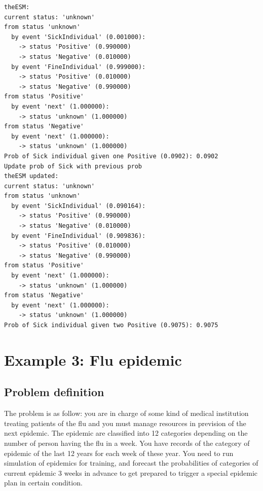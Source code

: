 \documentclass[12pt, a4paper]{article}
\begin{document}
\begin{scriptsize}
\begin{ttfamily}
\begin{lstlisting}
theESM:
current status: 'unknown'
from status 'unknown'
  by event 'SickIndividual' (0.001000):
    -> status 'Positive' (0.990000)
    -> status 'Negative' (0.010000)
  by event 'FineIndividual' (0.999000):
    -> status 'Positive' (0.010000)
    -> status 'Negative' (0.990000)
from status 'Positive'
  by event 'next' (1.000000):
    -> status 'unknown' (1.000000)
from status 'Negative'
  by event 'next' (1.000000):
    -> status 'unknown' (1.000000)
Prob of Sick individual given one Positive (0.0902): 0.0902
Update prob of Sick with previous prob
theESM updated:
current status: 'unknown'
from status 'unknown'
  by event 'SickIndividual' (0.090164):
    -> status 'Positive' (0.990000)
    -> status 'Negative' (0.010000)
  by event 'FineIndividual' (0.909836):
    -> status 'Positive' (0.010000)
    -> status 'Negative' (0.990000)
from status 'Positive'
  by event 'next' (1.000000):
    -> status 'unknown' (1.000000)
from status 'Negative'
  by event 'next' (1.000000):
    -> status 'unknown' (1.000000)
Prob of Sick individual given two Positive (0.9075): 0.9075
\end{lstlisting}
\end{ttfamily}
\end{scriptsize}

\section{Example 3: Flu epidemic}

\subsection{Problem definition}

The problem is as follow: you are in charge of some kind of medical institution treating patients of the flu and you must manage resources in prevision of the next epidemic. The epidemic are classified into 12 categories depending on the number of person having the flu in a week. You have records of the category of epidemic of the last 12 years for each week of these year. You need to run simulation of epidemics for training, and forecast the probabilities of categories of current epidemic 3 weeks in advance to get prepared to trigger a special epidemic plan in certain condition.\\
\end{document}
